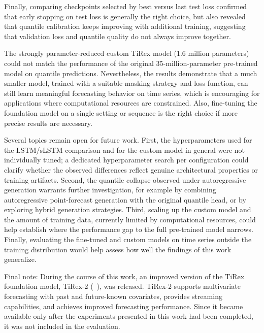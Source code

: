 \documentclass[a4paper,oneside,10pt,ngerman,english]{scrartcl}
\begin{document}
Finally, comparing checkpoints selected by best versus last test loss confirmed that early stopping on test loss is generally the right choice, but also revealed that quantile calibration keeps improving with additional training, suggesting that validation loss and quantile quality do not always improve together.

The strongly parameter-reduced custom TiRex model (1.6 million parameters) could not match the performance of the original 35-million-parameter pre-trained model on quantile predictions. Nevertheless, the results demonstrate that a much smaller model, trained with a suitable masking strategy and loss function, can still learn meaningful forecasting behavior on time series, which is encouraging for applications where computational resources are constrained. Also, fine-tuning the foundation model on a single setting or sequence is the right choice if more precise results are necessary. 

Several topics remain open for future work. First, the hyperparameters used for the LSTM/sLSTM comparison and for the custom model in general were not individually tuned; a dedicated hyperparameter search per configuration could clarify whether the observed differences reflect genuine architectural properties or training artifacts. Second, the quantile collapse observed under autoregressive generation warrants further investigation, for example by combining autoregressive point-forecast generation with the original quantile head, or by exploring hybrid generation strategies. Third, scaling up the custom model and the amount of training data, currently limited by computational resources, could help establish where the performance gap to the full pre-trained model narrows. Finally, evaluating the fine-tuned and custom models on time series outside the training distribution would help assess how well the findings of this work generalize.

Final note: During the course of this work, an improved version of the TiRex foundation model, TiRex-2 (\citeauthor{podest2026tirex2generalizingtirexmultivariate}~\cite{podest2026tirex2generalizingtirexmultivariate}), was released. TiRex-2 supports multivariate forecasting with past and future-known covariates, provides streaming capabilities, and achieves improved forecasting performance. Since it became available only after the experiments presented in this work had been completed, it was not included in the evaluation.


\end{document}
